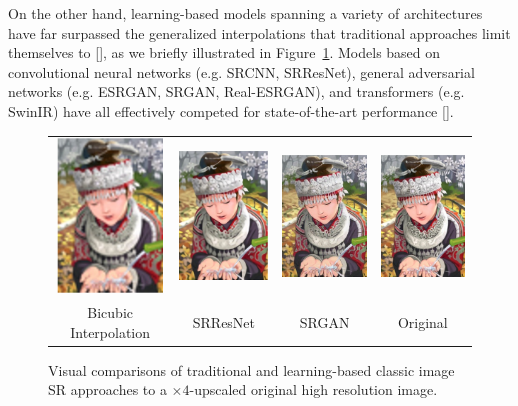 \documentclass{article}
\begin{document}
On the other hand, learning-based models spanning a variety of architectures have far surpassed the generalized interpolations that traditional approaches limit themselves to [], as we briefly illustrated in Figure~\ref{fig:example}. Models based on convolutional neural networks (e.g. SRCNN, SRResNet), general adversarial networks (e.g. ESRGAN, SRGAN, Real-ESRGAN), and transformers (e.g. SwinIR) have all effectively competed for state-of-the-art performance [].

\begin{figure}\label{fig:example}
    \centering
    \begin{tabular}{c c c c}
        \includegraphics[width=80pt]{bicubic.png} & \includegraphics[width=80pt]{srresnet.png} & \includegraphics[width=80pt]{srgan.png} & \includegraphics[width=80pt]{original.png} \\
        \small Bicubic Interpolation              & \small SRResNet                            & \small SRGAN                            & \small Original
    \end{tabular}
    \caption{Visual comparisons of traditional and learning-based classic image SR approaches to a $\times 4$-upscaled original high resolution image.}
\end{figure}
\end{document}
